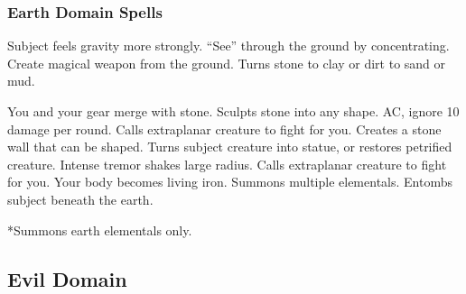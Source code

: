 \subsubsection{Earth Domain Spells}
\begin{spelllist}
   Subject feels gravity more strongly.
   ``See'' through the ground by concentrating.
   Create magical weapon from the ground.
   Turns stone to clay or dirt to sand or mud.
  
   You and your gear merge with stone.
   Sculpts stone into any shape.
    AC, ignore 10 damage per round.
   Calls extraplanar creature to fight for you.
  \spellhead[5]{}
   Creates a stone wall that can be shaped.
   Turns subject creature into statue, or restores petrified creature.
   Intense tremor shakes large radius.
   Calls extraplanar creature to fight for you.
   Your body becomes living iron.
  \spellhead[8]{}
   Summons multiple elementals.
   Entombs subject beneath the earth.
\end{spelllist}
*Summons earth elementals only.

\subsection{Evil Domain}

